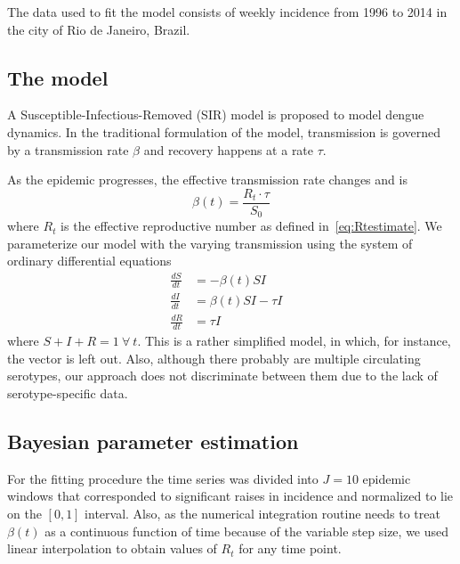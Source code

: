 The data used to fit the model consists of weekly incidence from 1996 to 2014 
in the city of Rio de Janeiro, Brazil.

\subsection*{The model}

A Susceptible-Infectious-Removed (SIR) model is proposed to model dengue dynamics.
In the traditional formulation of the model, transmission is governed by a 
transmission rate $\beta$ and recovery happens at a rate $\tau$.

As the epidemic progresses, the effective transmission  rate changes and is
\begin{equation} 
 \label{eq:effbeta}
 \beta(t) = \frac{R_t\cdot\tau}{S_0}
\end{equation}
where $R_t$ is the effective reproductive number as defined 
in~\ref{eq:Rtestimate}.
We parameterize our model with the varying transmission using the system of 
ordinary differential equations
\begin{align}
 \frac{dS}{dt} &= -\beta(t)SI \\
 \frac{dI}{dt} &= \beta(t)SI - \tau I&\\
 \frac{dR}{dt} &= \tau I&
\end{align}
where $S + I + R = 1 \: \forall\: t$. %
This is a rather simplified model, in which, for instance, the vector is left 
out.
Also, although there probably are multiple circulating serotypes, our approach
does not discriminate between them due to the lack of serotype-specific data.


\subsection*{Bayesian parameter estimation}

For the fitting procedure the time series was divided into $J=10$ epidemic 
windows that corresponded to significant raises in incidence and normalized to 
lie on the $[0,1]$ interval.
Also, as the numerical integration routine needs to treat $\beta(t)$ as a
continuous function of time because of the variable step size, we used linear 
interpolation to obtain values of $R_t$ for any time point.

